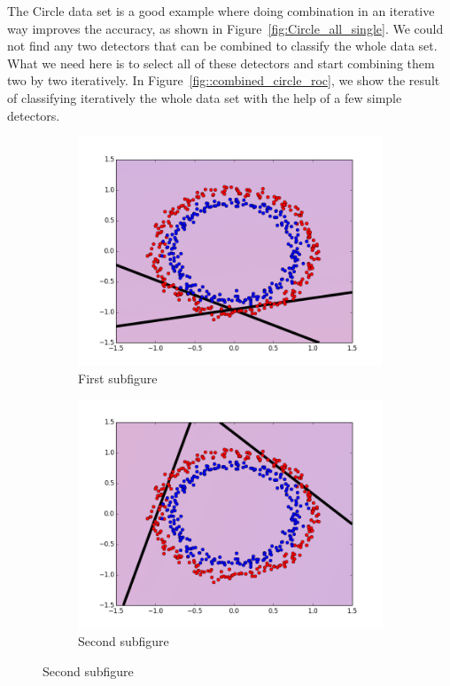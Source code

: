 The Circle data set is a good example where doing combination in an iterative way improves the accuracy, as shown in Figure~\ref{fig:Circle_all_single}. We could not find any two detectors that can be combined  to classify the whole data set. What we need here is to select all of these detectors and start  combining them two by two iteratively. In Figure~\ref{fig::combined_circle_roc}, we show the result of classifying iteratively  the whole data set with the help of a few simple detectors.


\begin{figure}[H] %
\begin{subfigure}{0.48\textwidth}
\includegraphics[width=\linewidth]{figs/Circle/11-two-circle}
\caption{First subfigure} \label{fig:Circle_all_single_a}
\end{subfigure}\hspace*{\fill}
\begin{subfigure}{0.48\textwidth}
\includegraphics[width=\linewidth]{figs/Circle/22-two-circle}
\caption{Second subfigure} \label{fig:Circle_all_single_b}
\end{subfigure}


\end{figure}
